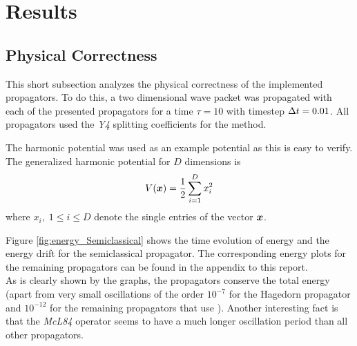 \section{Results}


\subsection{Physical Correctness}
%
This short subsection analyzes the physical correctness of the implemented propagators.
To do this, a two dimensional wave packet was propagated with each of the presented propagators for a time $\tau = 10$ with timestep $\Delta t = 0.01$.
All propagators used the \emph{Y4} splitting coefficients for the  method.
\par\medskip
%
The harmonic potential was used as an example potential as this is easy to verify.
The generalized harmonic potential for $D$ dimensions is
\begin{align}
	V(\bm{x}) = 
	\frac{1}{2} \sum_{i=1}^D x_i^2
\end{align}
%
where $x_i, \; 1 \le i \le D$ denote the single entries of the vector $\bm{x}$.
\par\medskip
%
Figure \ref{fig:energy_Semiclassical} shows the time evolution of energy and the energy drift for the semiclassical propagator. The corresponding energy plots for the remaining propagators can be found in the appendix to this report. \\
As is clearly shown by the graphs, the propagators conserve the total energy (apart from very small oscillations of the order $10^{-7}$ for the Hagedorn propagator and $10^{-12}$ for the remaining propagators that use ).
Another interesting fact is that the \emph{McL84} operator seems to have a much longer oscillation period than all other propagators.
%
